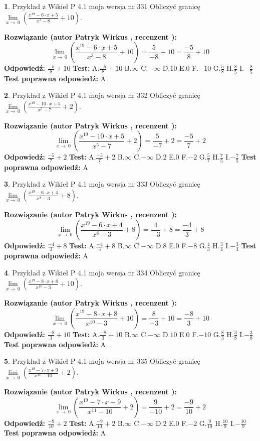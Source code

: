 \documentclass[12pt, a4paper]{article}
\theoremstyle{definition} %
\newtheorem{zad}{}
\newcommand{\zadStart}[1]{\begin{zad}#1\newline}
\newcommand{\zadStop}{\end{zad}}
\newcommand{\rozwStart}[2]{\noindent \textbf{Rozwiązanie (autor #1 , recenzent #2): }\newline}
\newcommand{\rozwStop}{\newline}
\newcommand{\odpStart}{\noindent \textbf{Odpowiedź:}\newline}
\newcommand{\odpStop}{\newline}
\newcommand{\testStart}{\noindent \textbf{Test:}\newline}
\newcommand{\testStop}{\newline}
\newcommand{\kluczStart}{\noindent \textbf{Test poprawna odpowiedź:}\newline}
\newcommand{\kluczStop}{\newline}
\begin{document}
\zadStart{Przykład z Wikieł P 4.1 moja wersja nr 331}
Obliczyć granicę $\lim\limits_{x\to\ 0}(\frac{x^{19}-6 \cdot x +5}{x^{3}-8}+10)$.
\zadStop
\rozwStart{Patryk Wirkus}{}
$$\lim\limits_{x\to\ 0}(\frac{x^{19}-6 \cdot x +5}{x^{3}-8}+10)=\frac{5}{-8}+10=\frac{-5}{8}+10$$
\rozwStop
\odpStart
$\frac{-5}{8}+10$
\odpStop
\testStart
A.$\frac{-5}{8}+10$
B.$\infty$
C.$-\infty$
D.$10$
E.$0$
F.$-10$
G.$\frac{5}{8}$
H.$\frac{8}{5}$
I.$-\frac{8}{5}$
\testStop
\kluczStart
A
\kluczStop



\zadStart{Przykład z Wikieł P 4.1 moja wersja nr 332}
Obliczyć granicę $\lim\limits_{x\to\ 0}(\frac{x^{19}-10 \cdot x +5}{x^{5}-7}+2)$.
\zadStop
\rozwStart{Patryk Wirkus}{}
$$\lim\limits_{x\to\ 0}(\frac{x^{19}-10 \cdot x +5}{x^{5}-7}+2)=\frac{5}{-7}+2=\frac{-5}{7}+2$$
\rozwStop
\odpStart
$\frac{-5}{7}+2$
\odpStop
\testStart
A.$\frac{-5}{7}+2$
B.$\infty$
C.$-\infty$
D.$2$
E.$0$
F.$-2$
G.$\frac{5}{7}$
H.$\frac{7}{5}$
I.$-\frac{7}{5}$
\testStop
\kluczStart
A
\kluczStop



\zadStart{Przykład z Wikieł P 4.1 moja wersja nr 333}
Obliczyć granicę $\lim\limits_{x\to\ 0}(\frac{x^{19}-6 \cdot x +4}{x^{8}-3}+8)$.
\zadStop
\rozwStart{Patryk Wirkus}{}
$$\lim\limits_{x\to\ 0}(\frac{x^{19}-6 \cdot x +4}{x^{8}-3}+8)=\frac{4}{-3}+8=\frac{-4}{3}+8$$
\rozwStop
\odpStart
$\frac{-4}{3}+8$
\odpStop
\testStart
A.$\frac{-4}{3}+8$
B.$\infty$
C.$-\infty$
D.$8$
E.$0$
F.$-8$
G.$\frac{4}{3}$
H.$\frac{3}{4}$
I.$-\frac{3}{4}$
\testStop
\kluczStart
A
\kluczStop



\zadStart{Przykład z Wikieł P 4.1 moja wersja nr 334}
Obliczyć granicę $\lim\limits_{x\to\ 0}(\frac{x^{19}-8 \cdot x +8}{x^{10}-3}+10)$.
\zadStop
\rozwStart{Patryk Wirkus}{}
$$\lim\limits_{x\to\ 0}(\frac{x^{19}-8 \cdot x +8}{x^{10}-3}+10)=\frac{8}{-3}+10=\frac{-8}{3}+10$$
\rozwStop
\odpStart
$\frac{-8}{3}+10$
\odpStop
\testStart
A.$\frac{-8}{3}+10$
B.$\infty$
C.$-\infty$
D.$10$
E.$0$
F.$-10$
G.$\frac{8}{3}$
H.$\frac{3}{8}$
I.$-\frac{3}{8}$
\testStop
\kluczStart
A
\kluczStop



\zadStart{Przykład z Wikieł P 4.1 moja wersja nr 335}
Obliczyć granicę $\lim\limits_{x\to\ 0}(\frac{x^{19}-7 \cdot x +9}{x^{11}-10}+2)$.
\zadStop
\rozwStart{Patryk Wirkus}{}
$$\lim\limits_{x\to\ 0}(\frac{x^{19}-7 \cdot x +9}{x^{11}-10}+2)=\frac{9}{-10}+2=\frac{-9}{10}+2$$
\rozwStop
\odpStart
$\frac{-9}{10}+2$
\odpStop
\testStart
A.$\frac{-9}{10}+2$
B.$\infty$
C.$-\infty$
D.$2$
E.$0$
F.$-2$
G.$\frac{9}{10}$
H.$\frac{10}{9}$
I.$-\frac{10}{9}$
\testStop
\kluczStart
A
\kluczStop
\end{document}
